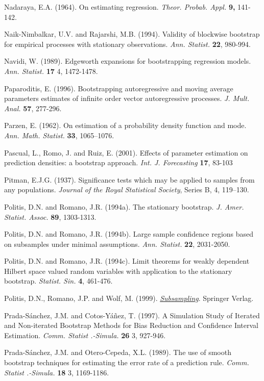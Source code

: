 \documentclass[
]{book}
\theoremstyle{break}
\theoremstyle{definition}
\theoremstyle{definition}
\theoremstyle{definition}
\theoremstyle{remark}
\begin{document}
Nadaraya, E.A. (1964). On estimating regression. \emph{Theor. Probab. Appl.}
\textbf{9,} 141-142.

Naik-Nimbalkar, U.V. and Rajarshi, M.B. (1994). Validity of blockwise
bootstrap for empirical processes with stationary observations.
\emph{Ann. Statist.} \textbf{22}, 980-994.

Navidi, W. (1989). Edgeworth expansions for bootstrapping regression
models. \emph{Ann. Statist.} \textbf{17} 4, 1472-1478.

Paparoditis, E. (1996). Bootstrapping autoregressive and moving average
parameters estimates of infinite order vector autoregressive processes.
\emph{J. Mult. Anal.} \textbf{57}, 277-296.

Parzen, E. (1962). On estimation of a probability density function and
mode. \emph{Ann. Math. Statist.} \textbf{33}, 1065--1076.

Pascual, L., Romo, J. and Ruiz, E. (2001). Effects of parameter
estimation on prediction densities: a bootstrap approach.
\emph{Int. J. Forecasting} \textbf{17}, 83-103

Pitman, E.J.G. (1937). Significance tests which may be applied to samples from any populations. \emph{Journal of the Royal Statistical Society}, Series B, 4, 119--130.

Politis, D.N. and Romano, J.R. (1994a). The stationary bootstrap.
\emph{J. Amer. Statist. Assoc.} \textbf{89}, 1303-1313.

Politis, D.N. and Romano, J.R. (1994b). Large sample confidence regions
based on subsamples under minimal assumptions. \emph{Ann. Statist.} \textbf{22},
2031-2050.

Politis, D.N. and Romano, J.R. (1994c). Limit theorems for weakly
dependent Hilbert space valued random variables with application to the
stationary bootstrap. \emph{Statist. Sin.} \textbf{4}, 461-476.

Politis, D.N., Romano, J.P. and Wolf, M. (1999). \href{https://books.google.es/books?hl=es\&lr=\&id=nGu6rqjE6JoC\&oi=fnd\&pg=PR7\&dq=Subsampling}{\emph{Subsampling}}.
Springer Verlag.

Prada-Sánchez, J.M. and Cotos-Yáñez, T. (1997). A Simulation Study of
Iterated and Non-iterated Bootstrap Methods for Bias Reduction and
Confidence Interval Estimation. \emph{Comm. Statist .-Simula.} \textbf{26} 3, 927-946.

Prada-Sánchez, J.M. and Otero-Cepeda, X.L. (1989). The use of smooth
bootstrap techniques for estimating the error rate of a prediction rule.
\emph{Comm. Statist .-Simula.} \textbf{18} 3, 1169-1186.
\end{document}
